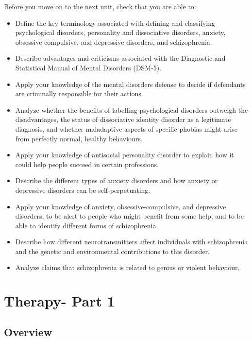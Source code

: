 \documentclass[
]{book}
\begin{document}
\begin{progress}
Before you move on to the next unit, check that you are able to:

\begin{itemize}
\item
  Define the key terminology associated with defining and classifying psychological disorders, personality and dissociative disorders, anxiety, obsessive-compulsive, and depressive disorders, and schizophrenia.
\item
  Describe advantages and criticisms associated with the Diagnostic and Statistical Manual of Mental Disorders (DSM-5).
\item
  Apply your knowledge of the mental disorders defense to decide if defendants are criminally responsible for their actions.
\item
  Analyze whether the benefits of labelling psychological disorders outweigh the disadvantages, the status of dissociative identity disorder as a legitimate diagnosis, and whether maladaptive aspects of specific phobias might arise from perfectly normal, healthy behaviours.
\item
  Apply your knowledge of antisocial personality disorder to explain how it could help people succeed in certain professions.
\item
  Describe the different types of anxiety disorders and how anxiety or depressive disorders can be self-perpetuating.
\item
  Apply your knowledge of anxiety, obsessive-compulsive, and depressive disorders, to be alert to people who might benefit from some help, and to be able to identify different forms of schizophrenia.
\item
  Describe how different neurotransmitters affect individuals with schizophrenia and the genetic and environmental contributions to this disorder.
\item
  Analyze claims that schizophrenia is related to genius or violent behaviour.
\end{itemize}
\end{progress}

\hypertarget{therapy--part-1}{%
\chapter{Therapy- Part 1}\label{therapy--part-1}}

\hypertarget{overview-10}{%
\section*{Overview}\label{overview-10}}
\end{document}
